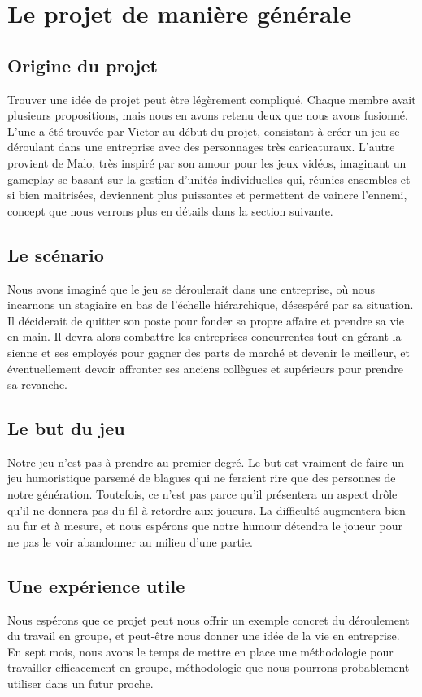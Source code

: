 \documentclass{article}
\begin{document}
\section{Le projet de manière générale}
\subsection{Origine du projet}
Trouver une idée de projet peut être légèrement compliqué. Chaque membre avait plusieurs propositions, mais nous en avons retenu deux que nous avons fusionné. L'une a été trouvée par Victor au début du projet, consistant à créer un jeu se déroulant dans une entreprise avec des personnages très caricaturaux. L'autre provient de Malo, très inspiré par son amour pour les jeux vidéos, imaginant un gameplay se basant sur la gestion d'unités individuelles qui, réunies ensembles et si bien maitrisées, deviennent plus puissantes et permettent de vaincre l'ennemi, concept que nous verrons plus en détails dans la section suivante.

\subsection{Le scénario}
Nous avons imaginé que le jeu se déroulerait dans une entreprise, où nous incarnons un stagiaire en bas de l'échelle hiérarchique, désespéré par sa situation. Il déciderait de quitter son poste pour fonder sa propre affaire et prendre sa vie en main. Il devra alors combattre les entreprises concurrentes tout en gérant la sienne et ses employés pour gagner des parts de marché et devenir le meilleur, et éventuellement devoir affronter ses anciens collègues et supérieurs pour prendre sa revanche.

\subsection{Le but du jeu}
Notre jeu n'est pas à prendre au premier degré. Le but est vraiment de faire un jeu humoristique parsemé de blagues qui ne feraient rire que des personnes de notre génération. Toutefois, ce n'est pas parce qu'il présentera un aspect drôle qu'il ne donnera pas du fil à retordre aux joueurs. La difficulté augmentera bien au fur et à mesure, et nous espérons que notre humour détendra le joueur pour ne pas le voir abandonner au milieu d'une partie.

\subsection{Une expérience utile}
Nous espérons que ce projet peut nous offrir un exemple concret du déroulement du travail en groupe, et peut-être nous donner une idée de la vie en entreprise. En sept mois, nous avons le temps de mettre en place une méthodologie pour travailler efficacement en groupe, méthodologie que nous pourrons probablement utiliser dans un futur proche.
\end{document}

